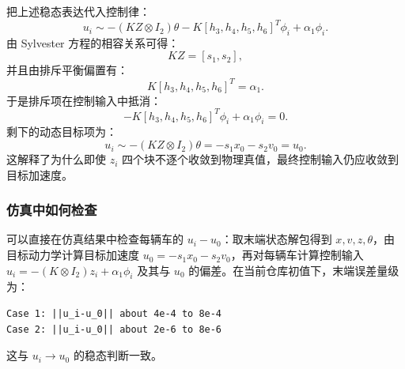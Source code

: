 把上述稳态表达代入控制律：
\[
u_i
\sim
-(KZ\otimes I_2)\theta
-
K[h_3,h_4,h_5,h_6]^T\phi_i
+\alpha_1\phi_i.
\]
由 Sylvester 方程的相容关系可得：
\[
KZ=[s_1,s_2],
\]
并且由排斥平衡偏置有：
\[
K[h_3,h_4,h_5,h_6]^T=\alpha_1.
\]
于是排斥项在控制输入中抵消：
\[
-
K[h_3,h_4,h_5,h_6]^T\phi_i
+\alpha_1\phi_i
=0.
\]
剩下的动态目标项为：
\[
u_i
\sim
-(KZ\otimes I_2)\theta
=
-s_1x_0-s_2v_0
=u_0.
\]
这解释了为什么即使 $z_i$ 四个块不逐个收敛到物理真值，最终控制输入仍应收敛到目标加速度。

\subsubsection{仿真中如何检查}

可以直接在仿真结果中检查每辆车的 $u_i-u_0$：取末端状态解包得到 $x, v, z, \theta$，由目标动力学计算目标加速度 $u_0 = -s_1 x_0 - s_2 v_0$，再对每辆车计算控制输入 $u_i = -(K\otimes I_2)z_i + \alpha_1\phi_i$ 及其与 $u_0$ 的偏差。在当前仓库初值下，末端误差量级为：
\begin{verbatim}
Case 1: ||u_i-u_0|| about 4e-4 to 8e-4
Case 2: ||u_i-u_0|| about 2e-6 to 8e-6
\end{verbatim}

这与 $u_i \to u_0$ 的稳态判断一致。